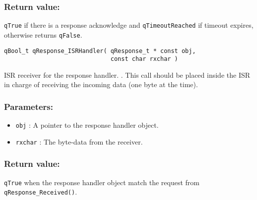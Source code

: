 \subsubsection*{Return value:}
\lstinline{qTrue} if there is a response acknowledge and \lstinline{qTimeoutReached} if timeout expires,  otherwise returns \lstinline{qFalse}.

\noindent\hrulefill

\begin{lstlisting}[style=CStyle]
qBool_t qResponse_ISRHandler( qResponse_t * const obj, 
                              const char rxchar )
\end{lstlisting}

ISR receiver for the response handler. . This call should be placed inside the ISR in charge of receiving the incoming data (one byte at the time).

\subsubsection*{Parameters:}
\begin{itemize}
    \item \lstinline{obj} : A pointer to the response handler object.
    \item \lstinline{rxchar} : The byte-data from the receiver.
\end{itemize}

\subsubsection*{Return value:}
\lstinline{qTrue} when the response handler object match the request from \lstinline{qResponse_Received()}.